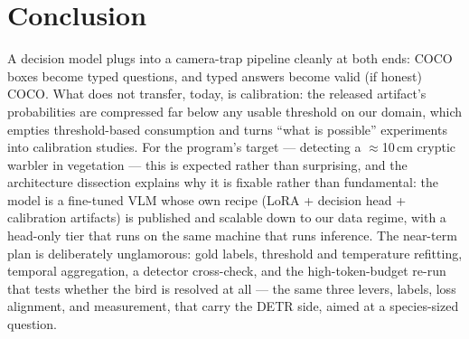 \documentclass[11pt]{article}
\begin{document}
\section{Conclusion}

A decision model plugs into a camera-trap pipeline cleanly at both ends: COCO
boxes become typed questions, and typed answers become valid (if honest) COCO.
What does not transfer, today, is calibration: the released artifact's
probabilities are compressed far below any usable threshold on our domain,
which empties threshold-based consumption and turns ``what is possible''
experiments into calibration studies. For the program's target --- detecting a
$\approx$10\,cm cryptic warbler in vegetation --- this is expected rather than
surprising, and the architecture dissection explains why it is fixable rather
than fundamental: the model is a fine-tuned VLM whose own recipe (LoRA +
decision head + calibration artifacts) is published and scalable down to our
data regime, with a head-only tier that runs on the same machine that runs
inference. The near-term plan is deliberately unglamorous: gold labels,
threshold and temperature refitting, temporal aggregation, a detector
cross-check, and the high-token-budget re-run that tests whether the bird is
resolved at all --- the same three levers, labels, loss alignment, and
measurement, that carry the DETR side, aimed at a species-sized question.
\end{document}
